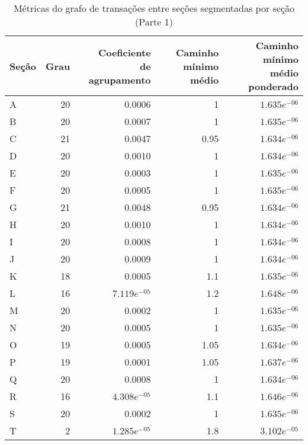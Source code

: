 \begin{table}[htb]
\centering
\caption{Métricas do grafo de transações entre seções segmentadas por seção (Parte 1)}
\label{tab:metricas-redes:grafo-por-secao-especificas1}
    \begin{tabular}{l|rrrr}
    \toprule
    Seção &  Grau &  \shortstack{Coeficiente\\de agrupamento} &  \shortstack{Caminho\\mínimo médio} &  \shortstack{Caminho mínimo\\médio ponderado} \\
    \midrule
    A &  20 &          0.0006 &     1 &  $1.635e^{-06}$ \\
    B &  20 &          0.0007 &     1 &  $1.635e^{-06}$ \\
    C &  21 &          0.0047 &  0.95 &  $1.634e^{-06}$ \\
    D &  20 &          0.0010 &     1 &  $1.634e^{-06}$ \\
    E &  20 &          0.0003 &     1 &  $1.635e^{-06}$ \\
    F &  20 &          0.0005 &     1 &  $1.635e^{-06}$ \\
    G &  21 &          0.0048 &  0.95 &  $1.634e^{-06}$ \\
    H &  20 &          0.0010 &     1 &  $1.634e^{-06}$ \\
    I &  20 &          0.0008 &     1 &  $1.634e^{-06}$ \\
    J &  20 &          0.0009 &     1 &  $1.634e^{-06}$ \\
    K &  18 &          0.0005 &   1.1 &  $1.635e^{-06}$ \\
    L &  16 &  $7.119e^{-05}$ &   1.2 &  $1.648e^{-06}$ \\
    M &  20 &          0.0002 &     1 &  $1.635e^{-06}$ \\
    N &  20 &          0.0005 &     1 &  $1.635e^{-06}$ \\
    O &  19 &          0.0005 &  1.05 &  $1.634e^{-06}$ \\
    P &  19 &          0.0001 &  1.05 &  $1.637e^{-06}$ \\
    Q &  20 &          0.0008 &     1 &  $1.634e^{-06}$ \\
    R &  16 &  $4.308e^{-05}$ &   1.1 &  $1.646e^{-06}$ \\
    S &  20 &          0.0002 &     1 &  $1.635e^{-06}$ \\
    T &   2 &  $1.285e^{-05}$ &   1.8 &  $3.102e^{-05}$ \\
    \bottomrule
    \end{tabular}
\fdadospesquisa
\end{table}

